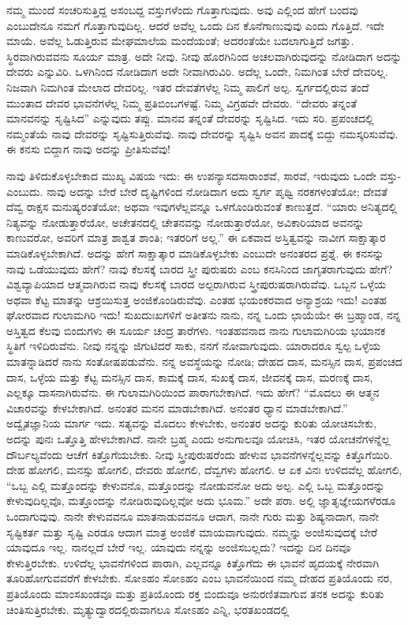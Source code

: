 ನಮ್ಮ ಮುಂದೆ ಸಂಚರಿಸುತ್ತಿದ್ದ ಅಸಂಬದ್ದ ವಸ್ತುಗಳೆಂದು ಗೊತ್ತಾಗುವುದು. ಅವು ಎಲ್ಲಿಂದ ಹೇಗೆ ಬಂದವು ಎಂಬುದೇನೂ ನಮಗೆ ಗೊತ್ತಾಗುವುದಿಲ್ಲ. ಆದರೆ ಅವೆಲ್ಲ ಒಂದು ದಿನ ಕೊನೆಗಾಣುವುವು ಎಂದು ಗೊತ್ತಿದೆ. ಇದೇ ಮಾಯೆ. ಅವೆಲ್ಲ ಓಡುತ್ತಿರುವ ಮೇಘಮಾಲೆಯ ಮಂದೆಯಂತೆ; ಅದರಂತೆಯೇ ಬದಲಾಗುತ್ತಿದೆ ಜಗತ್ತು. ಸ್ಥಿರವಾಗಿರುವವನು ಸೂರ್ಯ ಮಾತ್ರ. ಅದೇ ನೀವು. ನೀವು ಹೊರಗಿನಿಂದ ಅಚಲವಾಗಿರುವುದನ್ನು ನೋಡಿದಾಗ ಅದನ್ನು ದೇವರು ಎನ್ನುವಿರಿ. ಒಳಗಿನಿಂದ ನೋಡಿದಾಗ ಅದೇ ನೀವಾಗಿರುವಿರಿ. ಅದೆಲ್ಲ ಒಂದೇ, ನಿಮಗಿಂತ ಬೇರೆ ದೇವರಿಲ್ಲ. ನಿಜವಾಗಿ ನಿಮಗಿಂತ ಮೇಲಾದ ದೇವರಿಲ್ಲ. ಇತರ ದೇವತೆಗಳೆಲ್ಲ ನಿಮ್ಮ ಪಾಲಿಗೆ ಅಲ್ಪ. ಸ್ವರ್ಗದಲ್ಲಿರುವ ತಂದೆ ಮುಂತಾದ ದೇವರ ಭಾವನೆಗಳೆಲ್ಲ ನಿಮ್ಮ ಪ್ರತಿಬಿಂಬಗಳಷ್ಟೆ. ನಿಮ್ಮ ವಿಗ್ರಹವೇ ದೇವರು. “ದೇವರು ತನ್ನಂತೆ ಮಾನವನನ್ನು ಸೃಷ್ಟಿಸಿದ'' ಎನ್ನುವುದು ತಪ್ಪು. ಮಾನವ ತನ್ನಂತೆ ದೇವರನ್ನು ಸೃಷ್ಟಿಸಿದ. ಇದು ಸರಿ. ಪ್ರಪಂಚದಲ್ಲಿ ನಮ್ಮಂತೆಯೆ ನಾವು ದೇವರನ್ನು ಸೃಷ್ಟಿಸುತ್ತಿರುವೆವು. ನಾವು ದೇವರನ್ನು ಸೃಷ್ಟಿಸಿ ಅವನ ಪಾದಕ್ಕೆ ಬಿದ್ದು ನಮಸ್ಕರಿಸುವೆವು. ಈ ಕನಸು ಬಿದ್ದಾಗ ನಾವು ಅದನ್ನು ಪ್ರೀತಿಸುವೆವು!

ನಾವು ತಿಳಿದುಕೊಳ್ಳಬೇಕಾದ ಮುಖ್ಯ ವಿಷಯ ಇದು: ಈ ಉಪನ್ಯಾಸದ\break ಸಾರಾಂಶವೆ, ಸಾರವೆ, ಇರುವುದು ಒಂದೇ ವಸ್ತು-ಎಂಬುದು. ನಾವು ಅದನ್ನು ಬೇರೆ ಬೇರೆ ದೃಷ್ಟಿಗಳಿಂದ ನೋಡಿದಾಗ ಅದು ಸ್ವರ್ಗ ಪೃಥ್ವಿ ನರಕಗಳಂತೆಯೋ; ದೇವತೆ ದೆವ್ವ ರಾಕ್ಷಸ ಮನುಷ್ಯರಂತೆಯೋ; ಅಥವಾ ಇವುಗಳೆಲ್ಲವನ್ನೂ ಒಳಗೊಂಡಿರುವಂತೆ ಕಾಣುತ್ತದೆ. “ಯಾರು ಅನಿತ್ಯದಲ್ಲಿ ನಿತ್ಯವನ್ನು ನೋಡುತ್ತಾರೆಯೋ, ಅಚೇತನದಲ್ಲಿ ಚೇತನವನ್ನು ನೋಡುತ್ತಾರೆಯೋ, ಅವಿಕಾರಿಯಾದ ಅವನನ್ನು ಕಾಣುವರೋ, ಅವರಿಗೆ ಮಾತ್ರ ಶಾಶ್ವತ ಶಾಂತಿ; ಇತರರಿಗೆ ಅಲ್ಲ.” ಈ ಏಕವಾದ ಅಸ್ತಿತ್ವವನ್ನು ನಾವೀಗ ಸಾಕ್ಷಾತ್ಕಾರ ಮಾಡಿಕೊಳ್ಳಬೇಕಾಗಿದೆ. ಅದನ್ನು ಹೇಗೆ ಸಾಕ್ಷಾತ್ಕಾರ ಮಾಡಿಕೊಳ್ಳಬೇಕು ಎಂಬುದೇ ಅನಂತರದ ಪ್ರಶ್ನೆ. ಈ ಕನಸನ್ನು ನಾವು ಒಡೆಯುವುದು ಹೇಗೆ? ನಾವು ಕೆಲಸಕ್ಕೆ ಬಾರದ ಸ್ತ್ರೀ ಪುರುಷರು ಎಂಬ ಕನಸಿನಿಂದ ಜಾಗೃತರಾಗುವುದು ಹೇಗೆ? ವಿಶ್ವವ್ಯಾಪಿಯಾದ ಆತ್ಮವಾಗಿರುವ ನಾವು ಕೆಲಸಕ್ಕೆ ಬಾರದ ಅಲ್ಪರಾಗಿರುವ ಸ್ತ್ರೀಪುರುಷರಾಗಿರುವೆವು. ಒಬ್ಬನ ಒಳ್ಳೆಯ ಅಥವಾ ಕೆಟ್ಟ ಮಾತನ್ನು ಆಶ್ರಯಿಸುತ್ತ ಅಂಜಿಕೊಂಡಿರುವೆವು. ಎಂತಹ ಭಯಂಕರವಾದ ಅನ್ಯಾಶ್ರಯ ಇದು! ಎಂತಹ ಘೋರವಾದ ಗುಲಾಮಗಿರಿ ಇದು! ಸುಖದುಃಖಗಳಿಗೆ ಅತೀತನು ನಾನು, ನನ್ನ ಒಂದು ಛಾಯೆಯೇ ಈ ಬ್ರಹ್ಮಾಂಡ, ನನ್ನ ಅಸ್ತಿತ್ವದ ಕೆಲವು ಬಿಂದುಗಳು ಈ ಸೂರ್ಯ ಚಂದ್ರ ತಾರೆಗಳು. ಇಂತಹವನಾದ ನಾನು ಗುಲಾಮಗಿರಿಯ ಭಯಾನಕ ಸ್ಥಿತಿಗೆ ಇಳಿದಿರುವೆನು. ನೀವು ನನ್ನನ್ನು ಜಿಗುಟಿದರೆ ಸಾಕು, ನನಗೆ ನೋವಾಗುವುದು. ಯಾರಾದರೂ ಸ್ವಲ್ಪ ಒಳ್ಳೆಯ ಮಾತನ್ನಾಡಿದರೆ ನಾನು ಸಂತೋಷಪಡುವೆನು. ನನ್ನ ಅವಸ್ಥೆಯನ್ನು ನೋಡಿ; ದೇಹದ ದಾಸ, ಮನಸ್ಸಿನ ದಾಸ, ಪ್ರಪಂಚದ ದಾಸ, ಒಳ್ಳೆಯ ಮತ್ತು ಕೆಟ್ಟ ಮನಸ್ಸಿನ ದಾಸ, ಕಾಮಕ್ಕೆ ದಾಸ, ಸುಖಕ್ಕೆ ದಾಸ, ಜೀವನಕ್ಕೆ ದಾಸ, ಮರಣಕ್ಕೆ ದಾಸ, ಎಲ್ಲಕ್ಕೂ ದಾಸನಾಗಿರುವೆನು. ಈ ಗುಲಾಮಗಿರಿಯಿಂದ ಪಾರಾಗಬೇಕಾಗಿದೆ. ಇದು ಹೇಗೆ? “ಮೊದಲು ಈ ಆತ್ಮನ ವಿಚಾರವನ್ನು ಕೇಳಬೇಕಾಗಿದೆ. ಅನಂತರ ಮನನ ಮಾಡಬೇಕಾಗಿದೆ. ಅನಂತರ ಧ್ಯಾನ ಮಾಡಬೇಕಾಗಿದೆ.'' ಅದ್ವೈತಜ್ಞಾನಿಯ ಮಾರ್ಗ ಇದು. ಸತ್ಯವನ್ನು ಮೊದಲು ಕೇಳಬೇಕು, ಅನಂತರ ಅದನ್ನು ಕುರಿತು ಯೋಚಿಸಬೇಕು, ಅದನ್ನು ಪುನಃ ಒತ್ತೊತ್ತಿ ಹೇಳಬೇಕಾಗಿದೆ. ನಾನೇ ಬ್ರಹ್ಮ ಎಂದು ಅನುಗಾಲವೂ ಯೋಚಿಸಿ, ಇತರ ಯೋಚನೆಗಳನ್ನೆಲ್ಲ ದೌರ್ಬಲ್ಯವೆಂದು ಆಚೆಗೆ ಕಿತ್ತೊಗೆಯಬೇಕು. ನೀವು ಸ್ತ್ರೀಪುರುಷರೆಂದು ಹೇಳುವ ಭಾವನೆಗಳನ್ನೆಲ್ಲವನ್ನು ಕಿತ್ತೊಗೆಯಿರಿ. ದೇಹ ಹೋಗಲಿ, ಮನಸ್ಸು ಹೋಗಲಿ, ದೇವರು ಹೋಗಲಿ, ದೆವ್ವಗಳು ಹೋಗಲಿ. ಆ ಏಕ ವಿನಃ ಉಳಿದವೆಲ್ಲ ಹೋಗಲಿ, “ಒಬ್ಬ ಎಲ್ಲಿ ಮತ್ತೊಂದನ್ನು ಕೇಳುವನೊ, ಮತ್ತೊಂದನ್ನು ನೋಡುವನೋ ಅದು ಅಲ್ಪ. ಎಲ್ಲಿ ಒಬ್ಬ ಮತ್ತೊಂದನ್ನು ಕೇಳುವುದಿಲ್ಲವೊ, ಮತ್ತೊಂದನ್ನು ನೋಡಿರುವುದಿಲ್ಲವೋ ಅದು ಭೂಮ.” ಅದೇ ಪರಾ. ಅಲ್ಲಿ ಜ್ಞಾತೃಜ್ಞೇಯಗಳೆರಡೂ ಒಂದಾಗುವುವು. ನಾನೇ ಕೇಳುವವನೂ ಮಾತನಾಡುವವನೂ ಆದಾಗ, ನಾನೇ ಗುರು ಮತ್ತು ಶಿಷ್ಯನಾದಾಗ, ನಾನೇ ಸೃಷ್ಟಿಕರ್ತ ಮತ್ತು ಸೃಷ್ಟಿ ಎರಡೂ ಆದಾಗ ಮಾತ್ರ ಅಂಜಿಕೆ ಮಾಯವಾಗುವುದು. ನಮ್ಮನ್ನು ಅಂಜಿಸುವುದಕ್ಕೆ ಬೇರೆ ಯಾವುದೂ ಇಲ್ಲ. ನಾನಲ್ಲದೆ ಬೇರೆ ಇಲ್ಲ. ಯಾವುದು ನನ್ನನ್ನು ಅಂಜಿಸಬಲ್ಲದು? ಇದನ್ನು ದಿನ ದಿನವೂ ಕೇಳುತ್ತಿರಬೇಕು. ಉಳಿದೆಲ್ಲ ಭಾವನೆಗಳಿಂದ ಪಾರಾಗಿ, ಎಲ್ಲವನ್ನೂ ಕಿತ್ತೊಗೆದು ಈ ಭಾವನೆ ಹೃದಯಕ್ಕೆ ನೇರವಾಗಿ ತೂರಿಹೋಗುವವರೆಗೆ ಕೇಳಬೇಕು. ಸೋಽಹಂ ಸೋಽಹಂ ಎಂಬ ಭಾವನೆಯಿಂದ ನಮ್ಮ ದೇಹದ ಪ್ರತಿಯೊಂದು ನರ, ಪ್ರತಿಯೊಂದು ಮಾಂಸಖಂಡವೂ ಮತ್ತು ಪ್ರತಿಯೊಂದು ರಕ್ತ ಬಿಂದುವೂ ಅನುರಣಿತವಾಗುವ ತನಕ ಅದನ್ನು ಕುರಿತು ಚಿಂತಿಸುತ್ತಿರಬೇಕು. ಮೃತ್ಯುದ್ವಾರದಲ್ಲಿರುವಾಗಲೂ ಸೋಽಹಂ ಎನ್ನಿ, ಭರತಖಂಡದಲ್ಲಿ 